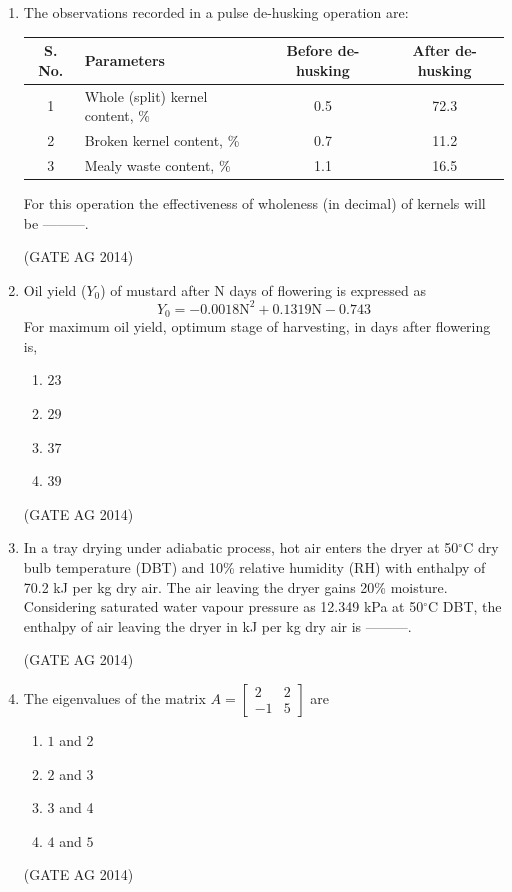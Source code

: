 \documentclass[journal,12pt,onecolumn]{IEEEtran}
\begin{document}
\begin{enumerate}
   \item The observations recorded in a pulse de-husking operation are:

\begin{table}[H]
\centering
\begin{tabular}{|c|l|c|c|}
\hline
\textbf{S. No.} & \textbf{Parameters} & \textbf{Before de-husking} & \textbf{After de-husking} \\
\hline
1 & Whole (split) kernel content, \% & 0.5 & 72.3 \\
\hline
2 & Broken kernel content, \% & 0.7 & 11.2 \\
\hline
3 & Mealy waste content, \% & 1.1 & 16.5 \\
\hline

\end{tabular}
\end{table}

For this operation the effectiveness of wholeness (in decimal) of kernels will be ---------.


    \hfill(GATE AG 2014)

    \item Oil yield ($Y_0$) of mustard after N days of flowering is expressed as
    \[ Y_0 = -0.0018  \text{N}^2 + 0.1319  \text{N} - 0.743 \]
    For maximum oil yield, optimum stage of harvesting, in days after flowering is,
    \begin{multicols}{4}
    \begin{enumerate}
        \item $23$
        \item $29$
        \item $37$
        \item $39$
    \end{enumerate}
    \end{multicols}
    \hfill(GATE AG 2014)

    \item In a tray drying under adiabatic process, hot air enters the dryer at 50$^\circ$C dry bulb temperature (DBT) and 10\% relative humidity (RH) with enthalpy of 70.2 kJ per kg dry air. The air leaving the dryer gains 20\% moisture. Considering saturated water vapour pressure as 12.349 kPa at 50$^\circ$C DBT, the enthalpy of air leaving the dryer in kJ per kg dry air is ---------.

    \hfill(GATE AG 2014)

    \item The eigenvalues of the matrix $A = \begin{bmatrix} 2 & 2 \\ -1 & 5 \end{bmatrix}$ are
    \begin{multicols}{4}
    \begin{enumerate}
        \item $1$ and 2
        \item $2$ and 3
        \item $3$ and 4
        \item $4$ and $5$
    \end{enumerate}
    \end{multicols}
    \hfill(GATE AG 2014)


\end{enumerate}
\end{document}
